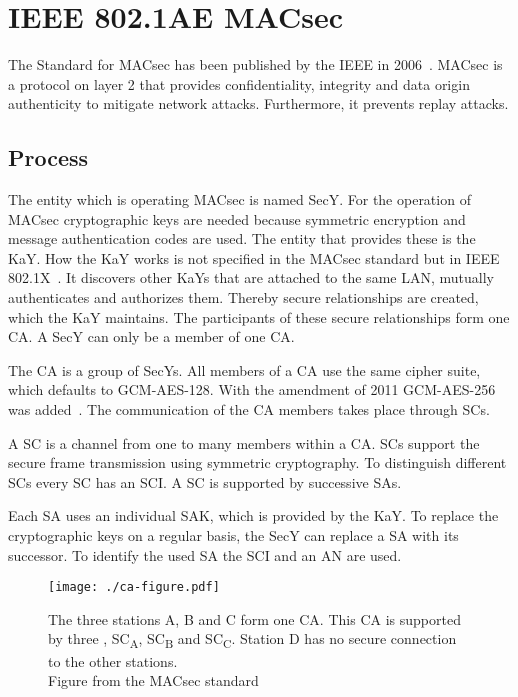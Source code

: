 \section{\acrshort{IEEE} 802.1AE \acrshort{MACsec}}
\label{sec:macsec}
The Standard for \acrfull{MACsec} has been published by the \gls{IEEE} in 2006~\cite{macsec}.
\gls{MACsec} is a protocol on layer 2 that provides confidentiality, integrity and data origin authenticity to mitigate network attacks.
Furthermore, it prevents replay attacks.

\subsection{Process}
The entity which is operating \gls{MACsec} is named \gls{SecY}.
For the operation of \gls{MACsec} cryptographic keys are needed because symmetric encryption and message authentication codes are used.
The entity that provides these is the \gls{KaY}.
How the \gls{KaY} works is not specified in the \gls{MACsec} standard but in IEEE 802.1X~\cite{ieee-802-1-x}.
It discovers other \glspl{KaY} that are attached to the same \gls{LAN}, mutually authenticates and authorizes them.
Thereby secure relationships are created, which the \gls{KaY} maintains.
The participants of these secure relationships form one \gls{CA}.
A \gls{SecY} can only be a member of one \gls{CA}.

The \gls{CA} is a group of \glspl{SecY}.
All members of a \gls{CA} use the same cipher suite, which defaults to GCM-AES-128.
With the amendment of 2011 GCM-AES-256 was added~\cite{macsecamendment1}.
The communication of the \gls{CA} members takes place through \glspl{SC}.

A \gls{SC} is a channel from one to many members within a \gls{CA}.
\glspl{SC} support the secure frame transmission using symmetric cryptography.
To distinguish different \glspl{SC} every \gls{SC} has an \gls{SCI}.
A \gls{SC} is supported by successive \glspl{SA}.

Each \gls{SA} uses an individual \gls{SAK}, which is provided by the \gls{KaY}.
To replace the cryptographic keys on a regular basis, the \gls{SecY} can replace a \gls{SA} with its successor.
To identify the used \gls{SA} the \gls{SCI} and an \gls{AN} are used.

\begin{figure}
  \centering
  \texttt{[image: ./ca-figure.pdf]}
  \caption[\acrshort{MACsec} participants form a \acrshort{CA}]{The three stations A, B and C form one \acrlong{CA}.
  This \gls{CA} is supported by three , \gls{SC}\textsubscript{A}, \gls{SC}\textsubscript{B} and \gls{SC}\textsubscript{C}.
  Station D has no secure connection to the other stations.\\
  Figure from the \gls{MACsec} standard~\cite[p.25]{macsec}}
  \label{fig:macsec-explanation}
\end{figure}

